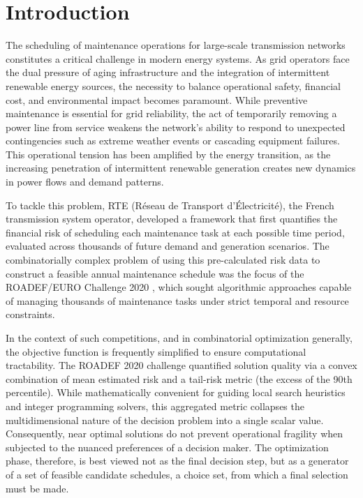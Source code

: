 \section{Introduction}
The scheduling of maintenance operations for large-scale transmission networks constitutes a critical challenge in modern energy systems. As grid operators face the dual pressure of aging infrastructure and the integration of intermittent renewable energy sources, the necessity to balance operational safety, financial cost, and environmental impact becomes paramount. While preventive maintenance is essential for grid reliability, the act of temporarily removing a power line from service weakens the network's ability to respond to unexpected contingencies such as extreme weather events or cascading equipment failures. This operational tension has been amplified by the energy transition, as the increasing penetration of intermittent renewable generation creates new dynamics in power flows and demand patterns.

To tackle this problem, RTE (Réseau de Transport d'Électricité), the French transmission system operator, developed a framework that first quantifies the financial risk of scheduling each maintenance task at each possible time period, evaluated across thousands of future demand and generation scenarios. The combinatorially complex problem of using this pre-calculated risk data to construct a feasible annual maintenance schedule was the focus of the ROADEF/EURO Challenge 2020 \citep{roadef2020}, which sought algorithmic approaches capable of managing thousands of maintenance tasks under strict temporal and resource constraints.

In the context of such competitions, and in combinatorial optimization generally, the objective function is frequently simplified to ensure computational tractability. The ROADEF 2020 challenge quantified solution quality via a convex combination of mean estimated risk and a tail-risk metric (the excess of the 90th percentile). While mathematically convenient for guiding local search heuristics and integer programming solvers, this aggregated metric collapses the multidimensional nature of the decision problem into a single scalar value. Consequently, near optimal solutions do not prevent operational fragility when subjected to the nuanced preferences of a decision maker. The optimization phase, therefore, is best viewed not as the final decision step, but as a generator of a set of feasible candidate schedules, a choice set, from which a final selection must be made.

